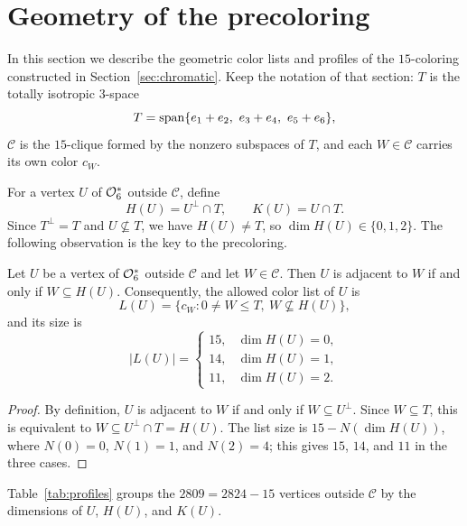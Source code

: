 \section{Geometry of the precoloring}
\label{sec:geometry}

In this section we describe the geometric color lists and profiles of the
\(15\)-coloring constructed in Section~\ref{sec:chromatic}.  Keep
the notation of that section: \(T\) is the totally isotropic
\(3\)-space
\[
T=\Span\{e_1+e_2,\ e_3+e_4,\ e_5+e_6\},
\]
\(\mathcal C\) is the \(15\)-clique formed by the nonzero subspaces of
\(T\), and each \(W\in\mathcal C\) carries its own color \(c_W\).

For a vertex \(U\) of \(\mathcal O_6^*\) outside \(\mathcal C\), define
\[
H(U)=U^\perp\cap T,\qquad K(U)=U\cap T.
\]
Since \(T^\perp=T\) and \(U\not\subseteq T\), we have \(H(U)\ne T\), so
\(\dim H(U)\in\{0,1,2\}\).  The following observation is the key to
the precoloring.

\begin{lemma}\label{lem:H-adjacency}
Let \(U\) be a vertex of \(\mathcal O_6^*\) outside \(\mathcal C\) and let
\(W\in\mathcal C\).  Then \(U\) is adjacent to \(W\) if and only if
\(W\subseteq H(U)\).  Consequently, the allowed color list of \(U\)
is
\[
L(U)=\{c_W : 0\ne W\le T,\ W\not\subseteq H(U)\},
\]
and its size is
\[
|L(U)|=\begin{cases}
15,&\dim H(U)=0,\\
14,&\dim H(U)=1,\\
11,&\dim H(U)=2.
\end{cases}
\]
\end{lemma}

\begin{proof}
By definition, \(U\) is adjacent to \(W\) if and only if
\(W\subseteq U^\perp\).  Since \(W\subseteq T\), this is equivalent to
\(W\subseteq U^\perp\cap T=H(U)\).  The list size is
\(15-N(\dim H(U))\), where \(N(0)=0\), \(N(1)=1\), and \(N(2)=4\);
this gives \(15\), \(14\), and \(11\) in the three cases.
\end{proof}

Table~\ref{tab:profiles} groups the \(2809=2824-15\) vertices outside
\(\mathcal C\) by the dimensions of \(U\), \(H(U)\), and \(K(U)\).

